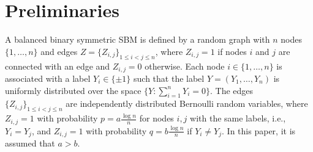 \documentclass[conference]{IEEEtran}
\begin{document}
	\section{Preliminaries}\label{s:model}
	A balanced binary symmetric SBM is defined by a random graph %
	with $n$ nodes $\{1,\ldots,n\}$ and edges $Z=\{Z_{i,j}\}_{1\le i<j\le n}$, where $Z_{i,j}=1$ if nodes $i$ and $j$ are connected with an edge and $Z_{i,j}=0$ otherwise. 
	Each node $i\in\{1,\ldots,n\}$ is associated with a label $Y_i\in \{\pm 1\}$ such that the label $Y=(Y_1,\ldots,Y_n)$ is uniformly distributed over the space $\{Y:\sum^n_{i=1}Y_i=0\}$. The edges $\{Z_{i,j}\}_{1\le i<j\le n}$ are independently distributed Bernoulli random variables, where $Z_{i,j}=1$ with probability $p=a\frac{\log n}{n}$ for nodes $i,j$ with the same labels, i.e., $Y_i=Y_j$, and $Z_{i,j}=1$ with probability $q=b\frac{\log n}{n}$ if $Y_i\ne Y_j$. In this paper, it is assumed that $a>b$. 

	
	
\end{document}
